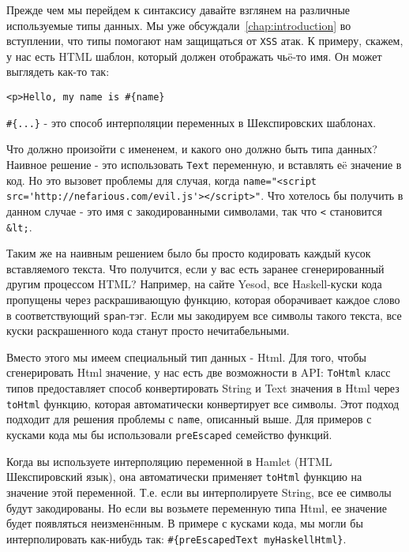Прежде чем мы перейдем к синтаксису давайте взглянем на различные используемые 
типы данных. Мы уже обсуждали~\ref{chap:introduction} во вступлении, что типы 
помогают нам защищаться от \texttt{XSS} атак. К примеру, скажем, 
у нас есть HTML шаблон, который должен отображать чьë-то имя. Он может выглядеть
как-то так:

\begin{lstlisting}
<p>Hello, my name is #{name}
\end{lstlisting}


\lstinline!#{...}! - это способ интерполяции переменных в Шекспировских шаблонах.

Что должно произойти с имененем, и какого оно должно быть типа данных?
Наивное решение - это использовать \texttt{Text} переменную, и вставлять 
еë значение в код.  
Но это вызовет проблемы для случая, когда
\lstinline!name="<script src='http://nefarious.com/evil.js'></script>"!.
Что хотелось бы получить в данном случае - это имя с закодированными символами, 
так что 
\lstinline!<! становится \lstinline!&lt;!.

Таким же на наивным решением было бы просто кодировать каждый кусок 
вставляемого текста. Что получится, если у вас есть заранее сгенерированный 
другим процессом HTML? Например, на сайте Yesod, все Haskell-куски кода 
пропущены через раскрашивающую функцию, которая оборачивает каждое слово
в соответствующий \texttt{span}-тэг. Если мы закодируем все символы такого 
текста, все куски раскрашенного кода станут просто нечитабельными.

Вместо этого мы имеем специальный тип данных - Html. Для того, чтобы сгенерировать
Html значение, у нас есть две возможности в API: \lstinline!ToHtml! класс типов
предоставляет способ конвертировать String и Text значения в Html через 
\lstinline!toHtml! функцию, которая автоматически конвертирует все символы.
Этот подход подходит для решения проблемы с \texttt{name}, описанный выше. Для
примеров с кусками кода мы бы использовали \lstinline!preEscaped! 
семейство функций.

Когда вы используете интерполяцию переменной в Hamlet (HTML Шекспировский язык), 
она автоматически применяет \lstinline!toHtml! функцию на значение 
этой переменной. Т.е. если вы интерполируете String, все ее символы 
будут закодированы. Но если вы возьмете переменную типа Html, ее значение
будет появляться неизменëнным. В примере с кусками кода, мы могли бы 
интерполировать как-нибудь так: \lstinline!#{preEscapedText myHaskellHtml}!.

